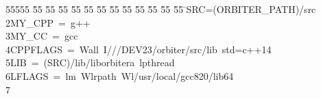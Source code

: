 %
%
\begin{tabbing}
55555 \= 55 \= 55 \= 55 \= 55 \= 55 \= 55 \= 55 \= 55 \= 55 \= 55 \= 55 \= 55 \= \>SRC=(ORBITER\_PATH)/src\\[0pt]
2\>MY\_CPP\ =\ g++\\[0pt]
3\>MY\_CC\ =\ gcc\\[0pt]
4\>CPPFLAGS\ =\ Wall\ I///DEV23/orbiter/src/lib\ std=c++14\\[0pt]
5\>LIB\ =\ (SRC)/lib/liborbitera\ lpthread\\[0pt]
6\>LFLAGS\ =\ lm\ Wlrpath\ Wl/usr/local/gcc820/lib64\\[0pt]
7\>\end{tabbing}
